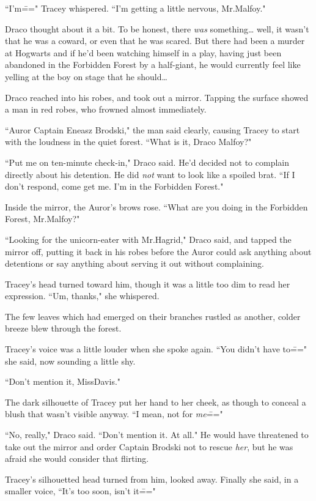 ``I'm\===" Tracey whispered. ``I'm getting a little nervous, Mr.\?Malfoy."

Draco thought about it a bit. To be honest, there \emph{was} something{\ldots} well, it wasn't that he was a coward, or even that he was scared. But there had been a murder at Hogwarts and if he'd been watching himself in a play, having just been abandoned in the Forbidden Forest by a half-giant, he would currently feel like yelling at the boy on stage that he should{\ldots}

Draco reached into his robes, and took out a mirror. Tapping the surface showed a man in red robes, who frowned almost immediately.

``Auror Captain Eneasz Brodski," the man said clearly, causing Tracey to start with the loudness in the quiet forest. ``What is it, Draco Malfoy?"

``Put me on ten-minute check-in," Draco said. He'd decided not to complain directly about his detention. He did \emph{not} want to look like a spoiled brat. ``If I don't respond, come get me. I'm in the Forbidden Forest."

Inside the mirror, the Auror's brows rose. ``What are you doing in the Forbidden Forest, Mr.\?Malfoy?"

``Looking for the unicorn-eater with Mr.\?Hagrid," Draco said, and tapped the mirror off, putting it back in his robes before the Auror could ask anything about detentions or say anything about serving it out without complaining.

Tracey's head turned toward him, though it was a little too dim to read her expression. ``Um, thanks," she whispered.

The few leaves which had emerged on their branches rustled as another, colder breeze blew through the forest.

Tracey's voice was a little louder when she spoke again. ``You didn't have to\===" she said, now sounding a little shy.

``Don't mention it, Miss\?Davis."

The dark silhouette of Tracey put her hand to her cheek, as though to conceal a blush that wasn't visible anyway. ``I mean, not for \emph{me}\==="

``No, really," Draco said. ``Don't mention it. At all." He would have threatened to take out the mirror and order Captain Brodski not to rescue \emph{her}, but he was afraid she would consider that flirting.

Tracey's silhouetted head turned from him, looked away. Finally she said, in a smaller voice, ``It's too soon, isn't it\==="

